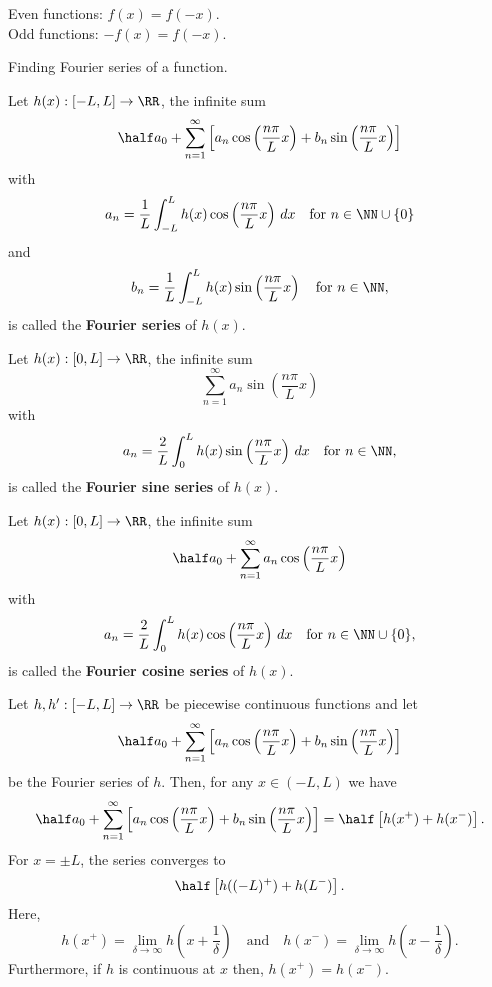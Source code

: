\documentclass[12pt, a4paper]{article}
\begin{document}
\begin{mdremark}
    Even functions: \(f(x)=f(-x)\). \\
    Odd functions: \(-f(x)=f(-x)\).
\end{mdremark}

\begin{mdexample}
    Finding Fourier series of a function.
\end{mdexample}

\begin{definition}
    Let \(h(x):[-L,L] \to \RR\), the infinite sum
    \[\half a_0 + \sum_{n=1}^{\infty} \left[ a_n \cos\left( \frac{n\pi}{L}x \right) +b_n \sin\left( \frac{n\pi}{L}x \right)\right]\]
    with 
    \[a_n = \frac{1}{L} \int_{-L}^{L} h(x)\cos\left( \frac{n\pi}{L}x \right) \, dx \quad \text{for } n \in \NN \cup \{0\}\]
    and 
    \[b_n = \frac{1}{L} \int_{-L}^L h(x)\sin\left( \frac{n\pi}{L}x \right) \quad \text{for } n \in \NN,\]
    is called the \textbf{Fourier series} of \(h(x)\).
\end{definition}

\begin{definition}
    Let \(h(x) : [0,L] \to \RR\), the infinite sum 
    \[\sum_{n=1}^{\infty} a_n \sin \left( \frac{n\pi}{L}x \right)\]
    with 
    \[a_n = \frac{2}{L} \int_{0}^{L} h(x) \sin \left( \frac{n\pi}{L}x \right) \, dx \quad \text{for } n \in \NN,\]
    is called the \textbf{Fourier sine series} of \(h(x)\).
\end{definition}

\begin{definition}
    Let \(h(x):[0,L] \to \RR\), the infinite sum 
    \[\half a_0 + \sum_{n=1}^{\infty} a_n \cos \left( \frac{n\pi}{L}x \right)\]
    with 
    \[a_n = \frac{2}{L} \int_0^L h(x) \cos\left( \frac{n\pi}{L}x \right) \, dx \quad \text{for } n \in \NN \cup \{0\},\]
    is called the \textbf{Fourier cosine series} of \(h(x)\).
\end{definition}

\begin{theorem}
    Let \(h,h' : [-L,L] \to \RR\) be piecewise continuous functions and let 
    \[\half a_0 + \sum_{n=1}^{\infty} \left[ a_n \cos\left( \frac{n\pi}{L}x \right)+b_n \sin \left( \frac{n\pi}{L}x \right) \right]\]
    be the Fourier series of \(h\). Then, for any \(x \in (-L,L)\) we have 
    \[\half a_0 + \sum_{n=1}^{\infty} \left[ a_n \cos\left( \frac{n\pi}{L}x \right)+b_n \sin \left( \frac{n\pi}{L}x \right) \right] = \half \left[ h(x^+)+h(x^-) \right].\]
    For \(x = \pm L\), the series converges to 
    \[\half \left[ h((-L)^+)+h(L^-) \right].\]
    Here,
    \[h(x^+) = \lim_{\delta \to \infty} h\left( x+\frac{1}{\delta} \right) \quad \text{and} \quad h(x^-)=\lim_{\delta\to\infty} h\left( x-\frac{1}{\delta} \right).\]
    Furthermore, if \(h\) is continuous at \(x\) then, \(h(x^+)=h(x^-)\).
\end{theorem}
\end{document}
